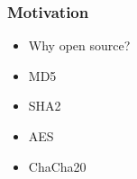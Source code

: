 \begin{frame}
  \frametitle{Motivation}
  \begin{itemize}
    \item Why open source?
    \item MD5
    \item SHA2
    \item AES
    \item ChaCha20
  \end{itemize}
\end{frame}
